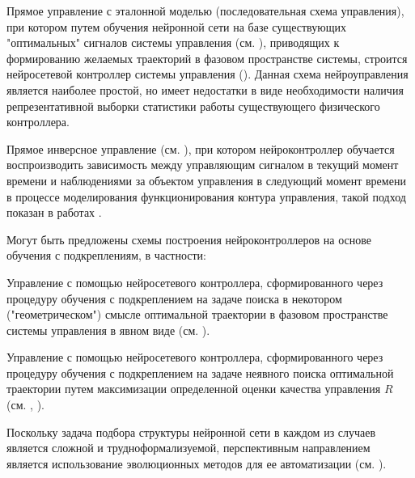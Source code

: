 \begin{textitemize}
    \item Прямое управление с эталонной моделью (последовательная схема управления), при котором путем обучения нейронной сети на базе существующих "оптимальных"{} сигналов системы управления (см. ), приводящих к формированию желаемых траекторий в фазовом пространстве системы, строится нейросетевой контроллер системы управления (). Данная схема  нейроуправления является наиболее простой, но имеет недостатки в виде необходимости наличия репрезентативной выборки статистики работы существующего физического контроллера.
    
    \item Прямое инверсное управление (см. ), при котором нейроконтроллер обучается воспроизводить зависимость между управляющим сигналом в текущий момент времени и наблюдениями за объектом управления в следующий момент времени в процессе моделирования функционирования контура управления, такой подход показан в работах  . 
    
    
    \item Могут быть предложены схемы построения нейроконтроллеров на основе обучения с подкреплениям, в частности:
    \begin{textitemize}
        \item  Управление с помощью нейросетевого контроллера, сформированного через процедуру обучения с подкреплением на задаче поиска в некотором ("геометрическом") смысле оптимальной траектории в фазовом пространстве системы управления в явном виде (см.   ).

        \item  Управление с помощью нейросетевого контроллера, сформированного через процедуру обучения с подкреплением на задаче неявного поиска оптимальной траектории путем максимизации определенной оценки качества управления $R$ (см. , ).    
    
    \end{textitemize}

\end{textitemize}

Поскольку задача подбора структуры нейронной сети в каждом из случаев является сложной и трудноформализуемой, перспективным направлением является использование эволюционных методов для ее автоматизации (см. ). 

